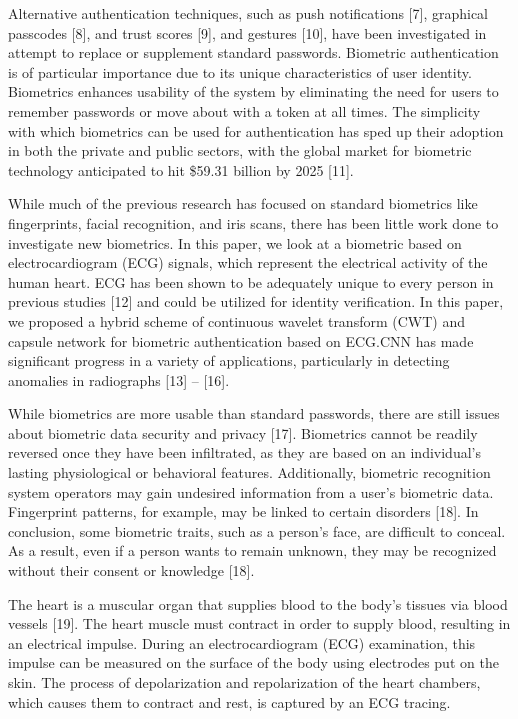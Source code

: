 \documentclass{standalone}
\begin{document}
Alternative authentication techniques, such as push notifications [7], graphical passcodes [8], and trust scores [9], and gestures [10], have been investigated in attempt to replace or supplement standard passwords. Biometric authentication is of particular importance due to its unique characteristics of user identity. Biometrics enhances usability of the system by eliminating the need for users to remember passwords or move about with a token at all times. The simplicity with which biometrics can be used for authentication has sped up their adoption in both the private and public sectors, with the global market for biometric technology anticipated to hit \$59.31 billion by 2025 [11].

While much of the previous research has focused on standard biometrics like fingerprints, facial recognition, and iris scans, there has been little work done to investigate new biometrics. In this paper, we look at a biometric based on electrocardiogram (ECG) signals, which represent the electrical activity of the human heart. ECG has been shown to be adequately unique to every person in previous studies [12] and could be utilized for identity verification. In this paper, we proposed a hybrid scheme of continuous wavelet transform (CWT) and capsule network for biometric authentication based on ECG.CNN has made significant progress in a variety of applications, particularly in detecting anomalies in radiographs [13] – [16]. 


While biometrics are more usable than standard passwords, there are still issues about biometric data security and privacy [17]. Biometrics cannot be readily reversed once they have been infiltrated, as they are based on an individual's lasting physiological or behavioral features. Additionally, biometric recognition system operators may gain undesired information from a user's biometric data. Fingerprint patterns, for example, may be linked to certain disorders [18]. In conclusion, some biometric traits, such as a person's face, are difficult to conceal. As a result, even if a person wants to remain unknown, they may be recognized without their consent or knowledge [18].

The heart is a muscular organ that supplies blood to the body's tissues via blood vessels [19]. The heart muscle must contract in order to supply blood, resulting in an electrical impulse. During an electrocardiogram (ECG) examination, this impulse can be measured on the surface of the body using electrodes put on the skin. The process of depolarization and repolarization of the heart chambers, which causes them to contract and rest, is captured by an ECG tracing.
\end{document}
